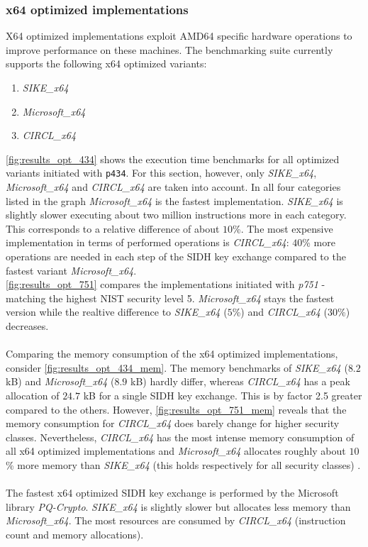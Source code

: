 \subsubsection{x64 optimized implementations}\label{sec:analysis_x64}
X64 optimized implementations exploit AMD64 specific hardware operations to improve performance on these machines. The benchmarking suite currently supports the following x64 optimized variants:
\begin{enumerate}
\item \textit{SIKE\_x64}
\item \textit{Microsoft\_x64}
\item \textit{CIRCL\_x64}
\end{enumerate}
\autoref{fig:results_opt_434} shows the execution time benchmarks for all optimized variants initiated with \texttt{p434}. For this section, however, only \textit{SIKE\_x64}, \textit{Microsoft\_x64} and \textit{CIRCL\_x64} are taken into account. In all four categories listed in the graph \textit{Microsoft\_x64}  is the fastest implementation. \textit{SIKE\_x64} is slightly slower executing about two million instructions more in each category. This corresponds to a relative difference of about $10$\%. The most expensive implementation in terms of performed operations is \textit{CIRCL\_x64}: $40$\% more operations are needed in each step of the SIDH key exchange compared to the fastest variant \textit{Microsoft\_x64}.
\\
\autoref{fig:results_opt_751} compares the implementations initiated with \textit{p751} - matching the highest NIST security level 5. \textit{Microsoft\_x64} stays the fastest version while the realtive difference to \textit{SIKE\_x64} ($5$\%) and \textit{CIRCL\_x64} ($30$\%) decreases.
\\\\
Comparing the memory consumption of the x64 optimized implementations, consider \autoref{fig:results_opt_434_mem}. The memory benchmarks of \textit{SIKE\_x64} ($8.2$ kB) and \textit{Microsoft\_x64} ($8.9$ kB) hardly differ, whereas \textit{CIRCL\_x64} has a peak allocation of $24.7$ kB for a single SIDH key exchange. This is by factor 2.5 greater compared to the others. However, \autoref{fig:results_opt_751_mem} reveals that the memory consumption for \textit{CIRCL\_x64} does barely change for higher security classes. Nevertheless,  \textit{CIRCL\_x64} has the most intense memory consumption of all x64 optimized implementations and \textit{Microsoft\_x64} allocates roughly about $10$\% more memory than \textit{SIKE\_x64} (this holds respectively for all security classes) .
\\\\
The fastest x64 optimized SIDH key exchange is performed by the Microsoft library \textit{PQ-Crypto}. \textit{SIKE\_x64} is slightly slower but allocates less memory than \textit{Microsoft\_x64}. The most resources are consumed by \textit{CIRCL\_x64} (instruction count and memory allocations).

